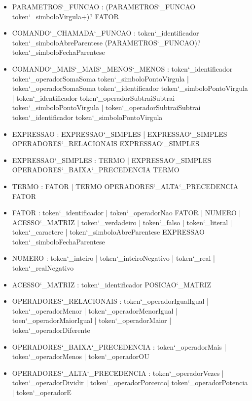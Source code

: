 \documentclass[
12pt,				%
a4paper,			%
english,			%
french,				%
spanish,			%
brazil,				%
article
]{abntex2}
\begin{document}
\begin{itemize}
	\item PARAMETROS\char`_FUNCAO : (PARAMETROS\char`_FUNCAO token\char`_simboloVirgula+)? FATOR
	
	\item COMANDO\char`_CHAMADA\char`_FUNCAO : token\char`_identificador token\char`_simboloAbreParentese (PARAMETROS\char`_FUNCAO)? token\char`_simboloFechaParentese
	\item COMANDO\char`_MAIS\char`_MAIS\char`_MENOS\char`_MENOS : token\char`_identificador token\char`_operadorSomaSoma token\char`_simboloPontoVirgula |  token\char`_operadorSomaSoma token\char`_identificador token\char`_simboloPontoVirgula | token\char`_identificador token\char`_operadorSubtraiSubtrai token\char`_simboloPontoVirgula | token\char`_operadorSubtraiSubtrai token\char`_identificador token\char`_simboloPontoVirgula
	\item EXPRESSAO : EXPRESSAO\char`_SIMPLES | EXPRESSAO\char`_SIMPLES OPERADORES\char`_RELACIONAIS EXPRESSAO\char`_SIMPLES
	\item EXPRESSAO\char`_SIMPLES : TERMO | EXPRESSAO\char`_SIMPLES OPERADORES\char`_BAIXA\char`_PRECEDENCIA TERMO
	\item TERMO : FATOR | TERMO OPERADORES\char`_ALTA\char`_PRECEDENCIA FATOR
	\item FATOR : token\char`_identificador | token\char`_operadorNao FATOR | NUMERO | ACESSO\char`_MATRIZ | token\char`_verdadeiro | token\char`_falso | token\char`_literal | token\char`_caractere | token\char`_simboloAbreParentese EXPRESSAO token\char`_simboloFechaParentese
	\item NUMERO : token\char`_inteiro | token\char`_inteiroNegativo | token\char`_real | token\char`_realNegativo
	\item ACESSO\char`_MATRIZ : token\char`_identificador POSICAO\char`_MATRIZ
	\item OPERADORES\char`_RELACIONAIS : token\char`_operadorIgualIgual | token\char`_operadorMenor | token\char`_operadorMenorIgual | toen\char`_operadorMaiorIgual | token\char`_operadorMaior | token\char`_operadorDiferente
	\item OPERADORES\char`_BAIXA\char`_PRECEDENCIA : token\char`_operadorMais | token\char`_operadorMenos | token\char`_operadorOU
	\item OPERADORES\char`_ALTA\char`_PRECEDENCIA : token\char`_operadorVezes | token\char`_operadorDividir | token\char`_operadorPorcento| token\char`_operadorPotencia | token\char`_operadorE
\end{itemize}
\end{document}
